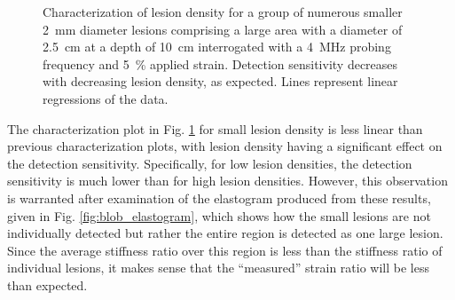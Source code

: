 			\begin{figure}[!htb]
				\centering
				\caption[Quasi-static lesion density characterization]{Characterization of lesion density for a group of numerous smaller \SI{2}{\mm} diameter lesions comprising a large area with a diameter of \SI{2.5}{\cm} at a depth of \SI{10}{\cm} interrogated with a \SI{4}{\MHz} probing frequency and \SI{5}{\percent} applied strain. Detection sensitivity decreases with decreasing lesion density, as expected. Lines represent linear regressions of the data.}
				\label{fig:blob_density_characterization}
			\end{figure}

			The characterization plot in Fig. \ref{fig:blob_density_characterization} for small lesion density is less linear than previous characterization plots, with lesion density having a significant effect on the detection sensitivity. Specifically, for low lesion densities, the detection sensitivity is much lower than for high lesion densities. However, this observation is warranted after examination of the elastogram produced from these results, given in Fig. \ref{fig:blob_elastogram}, which shows how the small lesions are not individually detected but rather the entire region is detected as one large lesion. Since the average stiffness ratio over this region is less than the stiffness ratio of individual lesions, it makes sense that the ``measured'' strain ratio will be less than expected.

